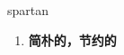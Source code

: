 
\begin{frame}
{\huge spartan}
\begin{center}
\begin{enumerate}\Large
  \item \textbf{简朴的，节约的}
\end{enumerate}
\end{center}
\end{frame}
